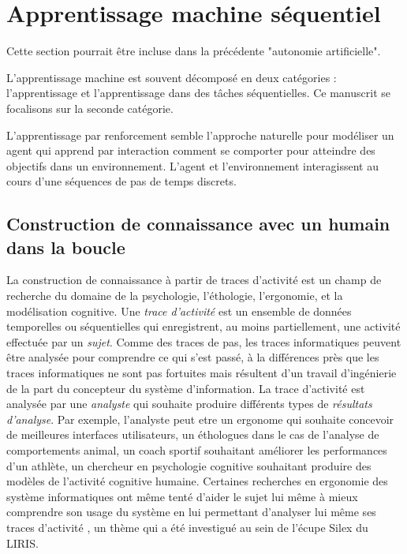 \chapter{Apprentissage machine séquentiel}

\noindent
Cette section pourrait être incluse dans la précédente "autonomie artificielle".

L'apprentissage machine est souvent décomposé en deux catégories : l'apprentissage  et l'apprentissage dans des tâches séquentielles.
Ce manuscrit se focalisons sur la seconde catégorie.


L'apprentissage par renforcement semble l'approche naturelle pour modéliser un agent qui apprend par interaction comment se comporter pour atteindre des objectifs dans un environnement. L'agent et l'environnement interagissent au cours d'une séquences de pas de temps discrets. 


\section{Construction de connaissance avec un humain dans la boucle }

La construction de connaissance à partir de traces d'activité est un champ de recherche du domaine de la psychologie, l'éthologie, l'ergonomie, et la modélisation cognitive. 
Une \textit{trace d'activité} est un ensemble de données temporelles ou séquentielles qui enregistrent, au moins partiellement, une activité effectuée par un \textit{sujet}.
Comme des traces de pas, les traces informatiques peuvent être analysée pour comprendre ce qui s'est passé, à la différences près que les traces informatiques ne sont pas fortuites mais résultent d'un travail d'ingénierie de la part du concepteur du système d'information. 
La trace d'activité est analysée par une \textit{analyste} qui souhaite produire différents types de \textit{résultats d'analyse}.
Par exemple, l'analyste peut etre un ergonome qui souhaite concevoir de meilleures interfaces utilisateurs, un éthologues dans le cas de l'analyse de comportements animal, un coach sportif souhaitant améliorer les performances d'un athlète, un chercheur en psychologie cognitive souhaitant produire des modèles de l'activité cognitive humaine. 
Certaines recherches en ergonomie des système informatiques ont même tenté d'aider le sujet lui même à mieux comprendre son usage du système en lui permettant d'analyser lui même ses traces d'activité \cite{choe_understanding_2017}, un thème qui a été investigué au sein de l'écupe Silex du LIRIS.  
 

